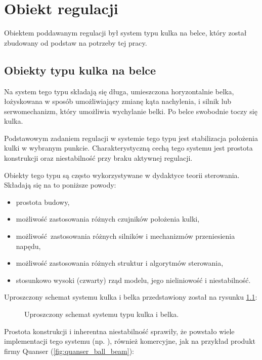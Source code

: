 \chapter{Obiekt regulacji}
\label{cha:ch2_obiekt_regulacji}

Obiektem poddawanym regulacji był system typu kulka na belce, który został zbudowany od podstaw na potrzeby tej pracy.

\section{Obiekty typu kulka na belce}

Na system tego typu składają się długa, umieszczona horyzontalnie belka, łożyskowana w sposób umożliwiający zmianę kąta nachylenia, i silnik lub serwomechanizm, który umożliwia wychylanie belki.
Po belce swobodnie toczy się kulka.

Podstawowym zadaniem regulacji w systemie tego typu jest stabilizacja położenia kulki w wybranym punkcie.
Charakterystyczną cechą tego systemu jest prostota konstrukcji oraz niestabilność przy braku aktywnej regulacji.

Obiekty tego typu są często wykorzystywane w dydaktyce teorii sterowania. Składają się na to poniższe powody:

\begin{itemize}
	\item prostota budowy,
	\item możliwość zastosowania różnych czujników położenia kulki,
	\item możliwość zastosowania różnych silników i mechanizmów przeniesienia napędu,
    \item możliwość zastosowania różnych struktur i algorytmów sterowania,
    \item stosunkowo wysoki (czwarty) rząd modelu, jego nieliniowość i niestabilność.
\end{itemize}

Uproszczony schemat systemu kulka i belka przedstawiony został na rysunku \ref{fig:schemat_uproszczony}:

\begin{figure}[H]
	\centering
    
	\caption{Uproszczony schemat systemu typu kulka i belka.}
	\label{fig:schemat_uproszczony}
\end{figure}

Prostota konstrukcji i inherentna niestabilność sprawiły, że powstało wiele implementacji tego systemu (np. \cite{BABEX1}\cite{BABEX2}\cite{BABEX3}), również komercyjne, jak na przykład produkt firmy Quanser (\cref{fig:quanser_ball_beam}):

